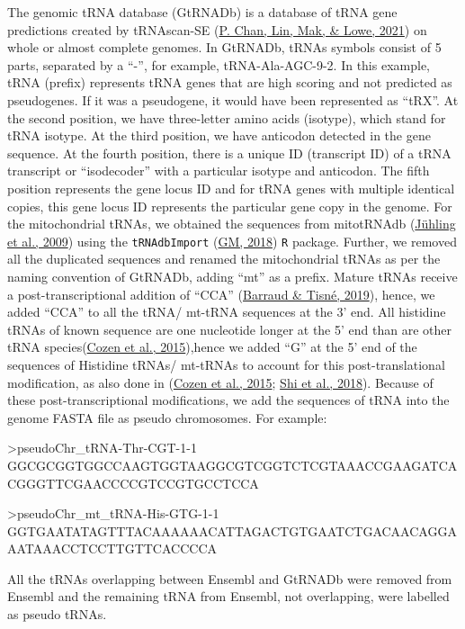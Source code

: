 \documentclass[12pt,twoside]{reedthesis}
\newenvironment{Shaded}{\begin{snugshade}}{\end{snugshade}}
\newcommand{\NormalTok}[1]{#1}
\begin{document}
The genomic tRNA database (GtRNADb) is a database of tRNA gene
predictions created by tRNAscan-SE (\protect\hyperlink{ref-chan2021}{P. Chan, Lin, Mak, \& Lowe, 2021}) on whole or almost
complete genomes. In GtRNADb, tRNAs symbols consist of 5 parts,
separated by a ``-'', for example, tRNA-Ala-AGC-9-2. In this example, tRNA
(prefix) represents tRNA genes that are high scoring and not predicted
as pseudogenes. If it was a pseudogene, it would have been represented
as ``tRX''. At the second position, we have three-letter amino acids
(isotype), which stand for tRNA isotype. At the third position, we have
anticodon detected in the gene sequence. At the fourth position, there
is a unique ID (transcript ID) of a tRNA transcript or ``isodecoder'' with
a particular isotype and anticodon. The fifth position represents the
gene locus ID and for tRNA genes with multiple identical copies, this
gene locus ID represents the particular gene copy in the genome. For the
mitochondrial tRNAs, we obtained the sequences from mitotRNAdb
(\protect\hyperlink{ref-juxfchling2009}{Jühling et al., 2009}) using the \texttt{tRNAdbImport} (\protect\hyperlink{ref-gm2018}{GM, 2018}) \texttt{R} package. Further,
we removed all the duplicated sequences and renamed the mitochondrial
tRNAs as per the naming convention of GtRNADb, adding ``mt'' as a prefix.
Mature tRNAs receive a post-transcriptional addition of ``CCA''
(\protect\hyperlink{ref-barraud2019}{Barraud \& Tisné, 2019}), hence, we added ``CCA'' to all the tRNA/ mt-tRNA sequences
at the 3' end. All histidine tRNAs of known sequence are one nucleotide
longer at the 5' end than are other tRNA species(\protect\hyperlink{ref-cozen2015}{Cozen et al., 2015}),hence we
added ``G'' at the 5' end of the sequences of Histidine tRNAs/ mt-tRNAs to
account for this post-translational modification, as also done in
(\protect\hyperlink{ref-cozen2015}{Cozen et al., 2015}; \protect\hyperlink{ref-shi2018}{Shi et al., 2018}). Because of these post-transcriptional
modifications, we add the sequences of tRNA into the genome FASTA file
as pseudo chromosomes. For example:
\begin{Shaded}
\begin{Highlighting}[]
\NormalTok{\textgreater{}pseudoChr\_tRNA{-}Thr{-}CGT{-}1{-}1}
\NormalTok{GGCGCGGTGGCCAAGTGGTAAGGCGTCGGTCTCGTAAACCGAAGATCACGGGTTCGAACCCCGTCCGTGCCTCCA}

\NormalTok{\textgreater{}pseudoChr\_mt\_tRNA{-}His{-}GTG{-}1{-}1}
\NormalTok{GGTGAATATAGTTTACAAAAAACATTAGACTGTGAATCTGACAACAGGAAATAAACCTCCTTGTTCACCCCA}
\end{Highlighting}
\end{Shaded}
All the tRNAs overlapping between Ensembl and GtRNADb were removed from
Ensembl and the remaining tRNA from Ensembl, not overlapping, were
labelled as pseudo tRNAs.
\end{document}
